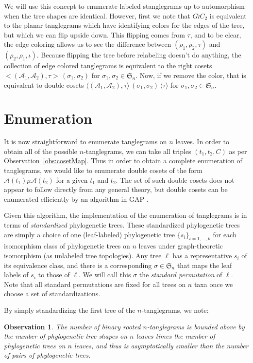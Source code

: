 \documentclass{amsart}
\newtheorem{observation}{Observation}
\newcommand{\fS}{\mathfrak S}
\newcommand{\aut}{\mathcal A}
\newcommand{\pairing}{\mu}
\newcommand{\id}{\iota}
\newcommand{\wrtwo}{\wr C_2}
\begin{document}
We will use this concept to enumerate labeled stanglegrams up to automorphism when the tree shapes are identical.
However, first we note that $G \wrtwo$ is equivalent to the planar tanglegrams which have identifying colors for the edges of the tree, but which we can flip upside down.
This flipping comes from $\tau$, and to be clear, the edge coloring allows us to see the difference between $(\rho_1, \rho_2, \tau)$ and $(\rho_2, \rho_1, \id)$.
Because flipping the tree before relabeling doesn't do anything, the collection of edge colored tanglegrams is equivalent to the right cosets $<(\aut_1, \aut_2), \tau> \, (\sigma_1, \sigma_2)$ for $\sigma_1, \sigma_2 \in \fS_n$.
Now, if we remove the color, that is equivalent to double cosets
$\langle(\aut_1, \aut_2), \tau \rangle \, (\sigma_1, \sigma_2) \, \langle \tau \rangle$ for $\sigma_1, \sigma_2 \in \fS_n$.


\section{Enumeration}
It is now straightforward to enumerate tanglegrams on $n$ leaves.
In order to obtain all of the possible $n$-tanglegrams, we can take all triples $(t_1, t_2, C)$ as per Observation~\ref{obs:cosetMap}.
Thus in order to obtain a complete enumeration of tanglegrams, we would like to enumerate double cosets of the form $\aut(t_1) \pairing \aut(t_2)$ for a given $t_1$ and $t_2$.
The set of such double cosets does not appear to follow directly from any general theory, but double cosets can be enumerated efficiently by an algorithm in GAP \cite{GAP4}.

Given this algorithm, the implementation of the enumeration of tanglegrams is in terms of \emph{standardized} phylogenetic trees.
These standardized phylogenetic trees are simply a choice of one (leaf-labeled) phylogenetic tree $\{s_i\}_{i=1,\ldots,k}$ for each isomorphism class of phylogenetic trees on $n$ leaves under graph-theoretic isomorphism (as unlabeled tree topologies).
Any tree $\ell$ has a representative $s_i$ of its equivalence class, and there is a corresponding $\sigma \in \fS_n$ that maps the leaf labels of $s_i$ to those of $\ell$.
We will call this $\sigma$ the \emph{standard permutation} of $\ell$.
Note that all standard permutations are fixed for all trees on $n$ taxa once we choose a set of standardizations.

By simply standardizing the first tree of the $n$-tanglegrams, we note:
\begin{observation}
\label{obs:count}
The number of binary rooted $n$-tanglegrams is bounded above by the number of phylogenetic tree shapes on $n$ leaves times the number of phylogenetic trees on $n$ leaves, and thus is asymptotically smaller than the number of pairs of phylogenetic trees.
\end{observation}
\end{document}
